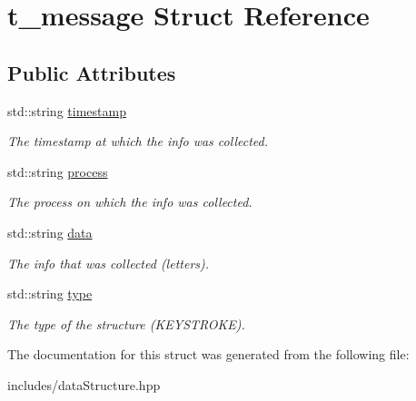 \hypertarget{structt__message}{}\section{t\+\_\+message Struct Reference}
\label{structt__message}
\subsection*{Public Attributes}
\begin{DoxyCompactItemize}
\item 
\mbox{\label{structt__message_a78226b09cca8516d9b85cec444f92f61}} 
std\+::string \hyperlink{structt__message_a78226b09cca8516d9b85cec444f92f61}{timestamp}
\begin{DoxyCompactList}\small\item\em The timestamp at which the info was collected. \end{DoxyCompactList}\item 
\mbox{\label{structt__message_a09c8c7051459f46f1ab5fee1d5ec0ef8}} 
std\+::string \hyperlink{structt__message_a09c8c7051459f46f1ab5fee1d5ec0ef8}{process}
\begin{DoxyCompactList}\small\item\em The process on which the info was collected. \end{DoxyCompactList}\item 
\mbox{\label{structt__message_ad5326c0efe685fcee7b5db0cbe4ae86b}} 
std\+::string \hyperlink{structt__message_ad5326c0efe685fcee7b5db0cbe4ae86b}{data}
\begin{DoxyCompactList}\small\item\em The info that was collected (letters). \end{DoxyCompactList}\item 
\mbox{\label{structt__message_a781cd3a5d2b77bf1312e664386b0616d}} 
std\+::string \hyperlink{structt__message_a781cd3a5d2b77bf1312e664386b0616d}{type}
\begin{DoxyCompactList}\small\item\em The type of the structure (K\+E\+Y\+S\+T\+R\+O\+KE). \end{DoxyCompactList}\end{DoxyCompactItemize}


The documentation for this struct was generated from the following file\+:\begin{DoxyCompactItemize}
\item 
includes/data\+Structure.\+hpp\end{DoxyCompactItemize}
